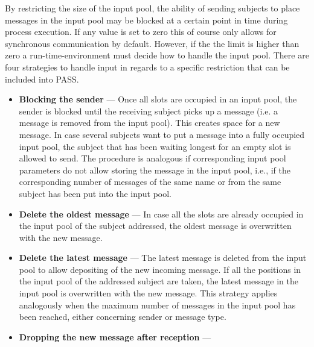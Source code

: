 By restricting the size of the input pool, the ability of sending subjects to place messages in the input pool may be blocked at a certain point in time during process execution. If any value is set to zero this of course only allows for synchronous communication by default. However, if the the limit is higher than zero a run-time-environment must decide how to handle the input pool. There are four strategies to handle input in regards to a specific restriction that can be included into PASS.

\begin{itemize}
	\item \textbf{Blocking the sender} --- Once all slots are occupied in an input pool, the sender is blocked until the receiving subject picks up a message (i.e. a message is removed from the input pool). This creates space for a new message. In case several subjects want to put a message into a fully occupied input pool, the subject that has been waiting longest for an empty slot is allowed to send. The procedure is analogous if corresponding input pool parameters do not allow storing the message in the input pool, i.e., if the corresponding number of messages of the same name or from the same subject has been put into the input pool.
	\item \textbf{Delete the oldest message} --- In case all the slots are already occupied in the input pool of the subject addressed, the oldest message is overwritten with the new message.
	\item \textbf{Delete the latest message} --- The latest message is deleted from the input pool to allow depositing of the new incoming message. If all the positions in the input pool of the addressed subject are taken, the latest message in the input pool is overwritten with the new message. This strategy applies analogously when the maximum number of messages in the input pool has been reached, either concerning sender or message type.
	\item \textbf{Dropping the new message after reception} ---
\end{itemize}